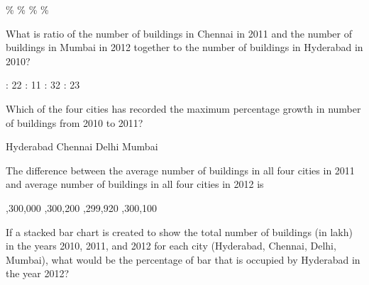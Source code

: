 \documentclass{exam}
\begin{document}
\begin{multicols}{2}
\begin{questions}
\begin{randomizechoices}
\% 
\%  
\% 
\% 
\end{randomizechoices}

\question   What is ratio of the number of buildings in Chennai in 2011 and the number of buildings in Mumbai in 2012 together to the number of buildings in Hyderabad in 2010?

\begin{randomizechoices}
 : 22 
 : 11  
 : 32 
 : 23 
\end{randomizechoices}

\question   Which of the four cities has recorded the maximum percentage growth in number of buildings from 2010 to 2011?

\begin{randomizechoices}
\correctchoice Hyderabad 
\choice Chennai  
\choice Delhi 
\choice Mumbai 
\end{randomizechoices}

\question   The difference between the average number of buildings in all four cities in 2011 and average number of buildings in all four cities in 2012 is

\begin{randomizechoices}
,300,000 
,300,200  
,299,920 
,300,100 
\end{randomizechoices}

\question   If a stacked bar chart is created to show the total number of buildings (in lakh) in the years 2010, 2011, and 2012 for each city (Hyderabad, Chennai, Delhi, Mumbai), what would be the percentage of bar that is occupied by Hyderabad in the year 2012?


\end{questions}
\end{multicols}
\end{document}
